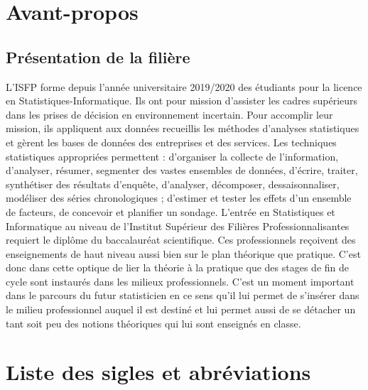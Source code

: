 \documentclass[12pt,a4paper]{report}
\begin{document}
	\newpage
	
	\chapter*{Avant-propos}       %
	
	\vspace*{2cm}
	
	
	\section*{Présentation de la filière}
	\vspace*{1cm}
	
	
	L'ISFP forme depuis l’année universitaire 2019/2020 des étudiants pour la licence en Statistiques-Informatique. Ils ont pour mission d’assister les cadres supérieurs dans les prises de décision en environnement incertain. Pour accomplir leur mission, ils appliquent aux données recueillis les méthodes d’analyses statistiques et gèrent les bases de données des entreprises et des services. Les techniques statistiques appropriées permettent : d’organiser la collecte de l’information, d’analyser, résumer,
	segmenter des vastes ensembles de données, d’écrire, traiter, synthétiser des résultats d’enquête, d’analyser, décomposer, dessaisonnaliser, modéliser des séries chronologiques ; d’estimer
	et tester les effets d’un ensemble de facteurs, de concevoir et planifier un sondage. L’entrée en
	Statistiques et Informatique au niveau de l’Institut Supérieur des Filières Professionnalisantes
	requiert le diplôme du baccalauréat scientifique. Ces professionnels reçoivent des enseignements
	de haut niveau aussi bien sur le plan théorique que pratique. C’est donc dans cette optique
	de lier la théorie à la pratique que des stages de fin de cycle sont instaurés dans les milieux
	professionnels. C’est un moment important dans le parcours du futur statisticien en ce sens
	qu’il lui permet de s’insérer dans le milieu professionnel auquel il est destiné et lui permet aussi
	de se détacher un tant soit peu des notions théoriques qui lui sont enseignés en classe.
	
	
	\newpage
	
	
	\chapter*{Liste des sigles et abréviations}       %
	
\end{document}
